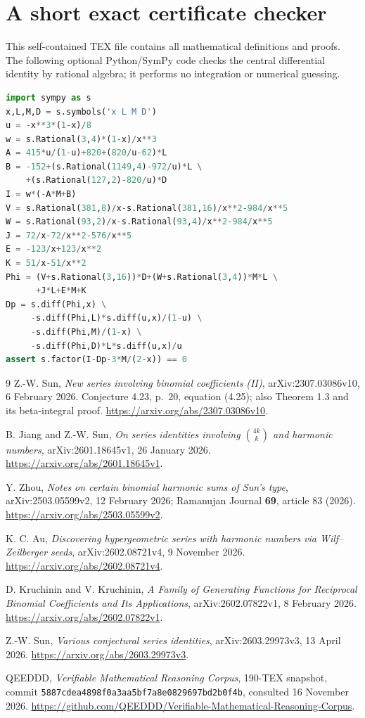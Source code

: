 \documentclass[11pt,a4paper]{article}
\numberwithin{equation}{section}
\begin{document}
\section{A short exact certificate checker}
This self-contained TEX file contains all mathematical definitions and proofs. The following optional Python/SymPy code checks the central differential identity by rational algebra; it performs no integration or numerical guessing.
\begin{lstlisting}[language=Python]
import sympy as s
x,L,M,D = s.symbols('x L M D')
u = -x**3*(1-x)/8
w = s.Rational(3,4)*(1-x)/x**3
A = 415*u/(1-u)+820+(820/u-62)*L
B = -152+(s.Rational(1149,4)-972/u)*L \
    +(s.Rational(127,2)-820/u)*D
I = w*(-A*M+B)
V = s.Rational(381,8)/x-s.Rational(381,16)/x**2-984/x**5
W = s.Rational(93,2)/x-s.Rational(93,4)/x**2-984/x**5
J = 72/x-72/x**2-576/x**5
E = -123/x+123/x**2
K = 51/x-51/x**2
Phi = (V+s.Rational(3,16))*D+(W+s.Rational(3,4))*M*L \
      +J*L+E*M+K
Dp = s.diff(Phi,x) \
     -s.diff(Phi,L)*s.diff(u,x)/(1-u) \
     -s.diff(Phi,M)/(1-x) \
     -s.diff(Phi,D)*L*s.diff(u,x)/u
assert s.factor(I-Dp-3*M/(2-x)) == 0
\end{lstlisting}

\begin{thebibliography}{9}
\bibitem{Sun}
Z.-W. Sun, \emph{New series involving binomial coefficients (II)}, arXiv:2307.03086v10, 6 February 2026. Conjecture 4.23, p.~20, equation (4.25); also Theorem 1.3 and its beta-integral proof.
\url{https://arxiv.org/abs/2307.03086v10}.

\bibitem{JS}
B. Jiang and Z.-W. Sun, \emph{On series identities involving $\binom{4k}{k}$ and harmonic numbers}, arXiv:2601.18645v1, 26 January 2026.
\url{https://arxiv.org/abs/2601.18645v1}.

Y. Zhou, \emph{Notes on certain binomial harmonic sums of Sun's type}, arXiv:2503.05599v2, 12 February 2026; Ramanujan Journal \textbf{69}, article 83 (2026).
\url{https://arxiv.org/abs/2503.05599v2}.

K. C. Au, \emph{Discovering hypergeometric series with harmonic numbers via Wilf--Zeilberger seeds}, arXiv:2602.08721v4, 9 November 2026.
\url{https://arxiv.org/abs/2602.08721v4}.

D. Kruchinin and V. Kruchinin, \emph{A Family of Generating Functions for Reciprocal Binomial Coefficients and Its Applications}, arXiv:2602.07822v1, 8 February 2026.
\url{https://arxiv.org/abs/2602.07822v1}.

Z.-W. Sun, \emph{Various conjectural series identities}, arXiv:2603.29973v3, 13 April 2026.
\url{https://arxiv.org/abs/2603.29973v3}.

QEEDDD, \emph{Verifiable Mathematical Reasoning Corpus}, 190-TEX snapshot, commit
\texttt{5887cdea4898f0a3aa5bf7a8e0829697bd2b0f4b}, consulted 16 November 2026.
\url{https://github.com/QEEDDD/Verifiable-Mathematical-Reasoning-Corpus}.
\end{thebibliography}
\end{document}
